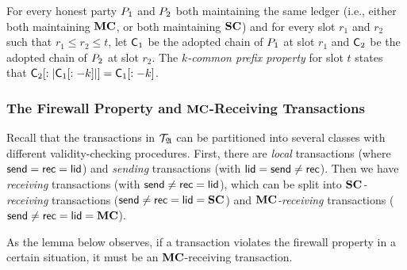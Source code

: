 \begin{definition}
  For every honest party $P_1$ and $P_2$
  both maintaining the same ledger (i.e., either both maintaining $\mathbf{MC}$, or both
  maintaining $\mathbf{SC}$) and for every slot $r_1$ and $r_2$ such that
  $r_1 \leq r_2 \leq t$, let $\mathsf{C}_1$ be the adopted chain of $P_1$ at
  slot $r_1$ and $\mathsf{C}_2$ be the adopted chain of $P_2$ at slot $r_2$.
  The \emph{$k$-common prefix property} for slot $t$ states
  that $\mathsf{C}_2[:|\mathsf{C}_1[:-k]|] = \mathsf{C}_1[:-k]$.
\end{definition}

\subsubsection{The Firewall Property and $\mathbf{MC}$-Receiving Transactions}

Recall that the transactions in $\mathcal{T}_{\mathfrak{A}}$ can be partitioned into several classes with
different validity-checking procedures. First, there are
\emph{local} transactions (where $\mathsf{send}=\mathsf{rec}=\mathsf{lid}$)
and
\emph{sending} transactions (with $\mathsf{lid}=\mathsf{send}\neq\mathsf{rec}$).
Then we have
\emph{receiving} transactions (with $\mathsf{send}\neq\mathsf{rec}=\mathsf{lid}$),
which can be split into
\emph{$\mathbf{SC}$-receiving} transactions ($\mathsf{send}\neq\mathsf{rec}=\mathsf{lid}=\mathbf{SC}$)
and
\emph{$\mathbf{MC}$-receiving} transactions ($\mathsf{send}\neq\mathsf{rec}=\mathsf{lid}=\mathbf{MC}$).

As the lemma below observes, if a transaction violates the firewall property in
a certain situation, it must be an $\mathbf{MC}$-receiving transaction.




